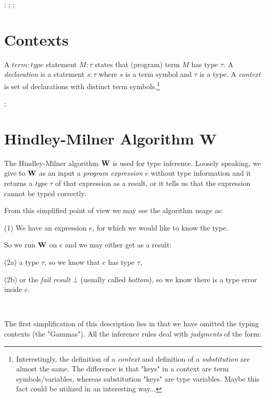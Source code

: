 \documentclass[a4paper,oneside]{memoir}
\begin{document}
 ;  ;  ; 



\section{Contexts}

\begin{definition}
A $\mathit{term:type}$ statement $\mathit{M}:\mathit{\tau}$ states that (program) term $M$ has type $\tau$.   
A \textit{declaration} is a statement $s : \tau$ where $s$ is a term symbol and $\tau$ is a type.
A \textit{context} is set of declarations with distinct term symbols.\footnote{Interestingly, the definition of a \textit{context} and definition of a \textit{substitution} are almost the same. The difference is that "keys" in a context are term symbols/variables, whereas substitution "keys" are type variables. Maybe this fact could be utilized in an interesting way...}
\end{definition}



 ; 



\section{Hindley-Milner Algorithm W}

The Hindley-Milner algorithm $\operatorname{\textbf{W}}$ is used for type inference.
Loosely speaking, we give to $\operatorname{\textbf{W}}$ as an input 
a \textit{program expression} $e$ without type information 
and it returns a \textit{type} $\tau$ of that expression as a result, 
or it tells us that the expression cannot be typed correctly.

From this simplified point of view we may see the algorithm usage as:

(1) We have an expression $e$, for which we would like to know the type. 

So we run $\operatorname{\textbf{W}}$ on $e$ and we may either get as a result:

(2a) a type $\tau$, so we know that $e$ has type $\tau$,

(2b) or the \textit{fail result} $\bot$ (usually called \textit{bottom}), so we know there is a type error inside $e$.

~   

The first simplification of this description lies in that we have omitted 
the typing contexts (the "Gammas"). 
All the inference rules deal with \textit{judgments} of the form:
\end{document}
